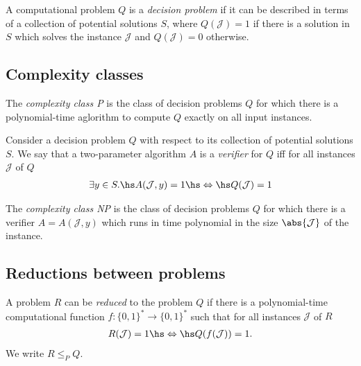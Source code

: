 \documentclass{article}
\begin{document}
\begin{definition}
	A computational problem $Q$ is a \emph{decision problem} if
	it can be described in terms of a collection of potential
	solutions $S$, where $Q(\mathcal{J})=1$ if there is a solution
	in $S$ which solves the instance $\mathcal{J}$ and $Q(\mathcal{J})=0$
	otherwise.
\end{definition}

\subsection{Complexity classes}

\begin{definition}
	The \emph{complexity class P} is the class of decision problems
	$Q$ for which there is a polynomial-time aglorithm to compute $Q$
	exactly on all input instances.
\end{definition}

\begin{definition}
	Consider a decision problem $Q$ with respect to its collection
	of potential solutions $S$. We say that a two-parameter algorithm
	$A$ is a \emph{verifier} for $Q$ iff for all instances
	$\mathcal{J}$ of $Q$
	\begin{align*}
		\exists y\in S.\hs A(\mathcal{J},y)=1\hs\Leftrightarrow\hs Q(\mathcal{J})=1
	\end{align*}
\end{definition}

\begin{definition}
	The \emph{complexity class NP} is the class of decision problems $Q$
	for which there is a verifier $A=A(\mathcal{J}, y)$ which runs in time
	polynomial in the size $\abs{\mathcal{J}}$ of the instance.
\end{definition}

\subsection{Reductions between problems}

\begin{definition}
	A problem $R$ can be \emph{reduced} to the problem $Q$ if there
	is a polynomial-time computational function $f:\{0,1\}^*\to\{0,1\}^*$
	such that for all instances $\mathcal{J}$ of $R$
	\begin{align*}
		R(\mathcal{J})=1 \hs\Leftrightarrow\hs Q(f(\mathcal{J}))=1.
	\end{align*}
	We write $R\leq_P Q$.
\end{definition}
\end{document}
